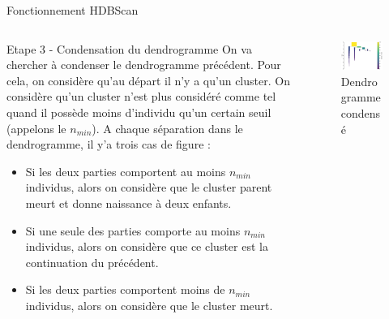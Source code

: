 \begin{frame}{Fonctionnement HDBScan }
    \begin{columns}
        \begin{column}{0.55\textwidth}
            \begin{block}{Etape 3 - Condensation du dendrogramme}
                    On va chercher à condenser le dendrogramme précédent. Pour cela, on considère qu'au départ il n'y a qu'un cluster.
                    On considère qu'un cluster n'est plus considéré comme tel quand il possède moins d'individu qu'un certain seuil (appelons le $n_{min}$).
                    A chaque séparation dans le dendrogramme, il y'a trois cas de figure :
                    \begin{itemize}
                        \item Si les deux parties comportent au moins $n_{min}$ individus, alors on considère que le cluster parent meurt et donne naissance à deux enfants.
                        \item Si une seule des parties comporte au moins $n_{min}$ individus, alors on considère que ce cluster est la continuation du précédent.
                        \item Si les deux parties comportent moins de $n_{min}$ individus, alors on considère que le cluster meurt.
                    \end{itemize}

            \end{block}
        \end{column}
        \begin{column}{0.45\textwidth}
            \begin{figure}
                \includegraphics[height=0.4\paperheight]{images/Illustration-HDBScan-4.png}
                \caption{\label{fig:ill_HDBScan_4} Dendrogramme condensé}
            \end{figure}
        \end{column}
    \end{columns}
\end{frame}

